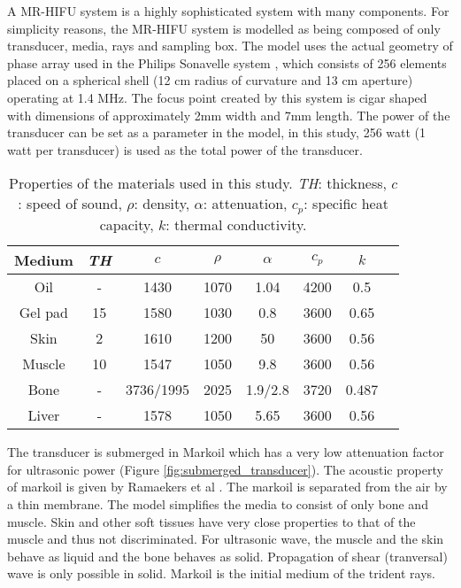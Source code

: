 A MR-HIFU system is a highly sophisticated system with many components. For simplicity reasons, the MR-HIFU system is modelled as being composed of only transducer, media, rays and sampling box. The model uses the actual geometry of phase array used in the Philips Sonavelle system \cite{sonavelle}, which consists of 256 elements placed on a spherical shell (12 cm radius of curvature and 13 cm aperture) operating at 1.4 MHz. The focus point created by this system is cigar shaped with dimensions of approximately 2mm width and 7mm length. The power of the transducer can be set as a parameter in the model, in this study, 256 watt (1 watt per transducer) is used as the total power of the transducer. 

\begin{table}[h!]
    \centering
    \begin{tabular}{c c c c c c c c} 
        \hline
        Medium & \textit{TH} & $c$ & $\rho$ & $\alpha$ & $c_p$ & $k$ \\ [0.5ex] 
        \hline\hline
        Oil & - & 1430 & 1070 & 1.04 & 4200 & 0.5 \\
        \hline
        Gel pad & 15 & 1580 & 1030 & 0.8 & 3600 & 0.65 \\
        \hline
        Skin & 2 & 1610 & 1200 & 50 & 3600 & 0.56 \\
        \hline
        Muscle & 10 & 1547 & 1050 & 9.8 & 3600 & 0.56 \\
        \hline
        Bone & - & 3736/1995 & 2025 & 1.9/2.8 & 3720 & 0.487 \\
        \hline
        Liver & - & 1578 & 1050 & 5.65 & 3600 & 0.56 \\
        \hline
    \end{tabular}
    \caption{Properties of the materials used in this study. \textit{TH}: thickness,  $c$: speed of sound, $\rho$: density,  $\alpha$: attenuation, $c_p$: specific heat capacity, $k$: thermal conductivity. \cite{Modena_2018} \cite{markoil}}
    \label{tb:media_property}
\end{table}

The transducer is submerged in Markoil which has a very low attenuation factor for ultrasonic power (Figure \ref{fig:submerged_transducer}). The acoustic property of markoil is given by Ramaekers et al \cite{markoil}. The markoil is separated from the air by a thin membrane. The model simplifies the media to consist of only bone and muscle. Skin and other soft tissues have very close properties to that of the muscle and thus not discriminated. For ultrasonic wave, the muscle and the skin behave as liquid and the bone behaves as solid. Propagation of shear (tranversal) wave is only possible in solid. Markoil is the initial medium of the trident rays. 

